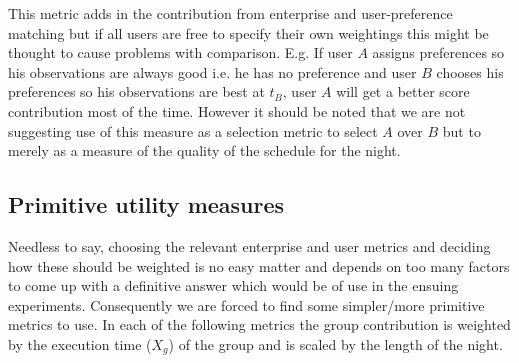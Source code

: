 This metric adds in the contribution from enterprise and user-preference matching but if all users are free to specify their own weightings this might be thought to cause problems with comparison. E.g. If user $A$ assigns preferences so his observations are always good i.e. he has no preference and user $B$ chooses his preferences so his observations are best at $t_B$, user $A$ will get a better score contribution most of the time. However it should be noted that we are not suggesting use of this measure as a selection metric to select $A$ over $B$ but to merely as a measure of the quality of the schedule for the night.




\subsection{Primitive utility measures}
\label{sect:prim_metrics}
Needless to say, choosing the relevant enterprise and user metrics and deciding how these should be weighted is no easy matter and depends on too many factors to come up with a definitive answer which would be of use in the ensuing experiments. Consequently we are forced to find some simpler/more primitive metrics to use. In each of the following metrics the group contribution is weighted by the execution time ($X_g$) of the group and is scaled by the length of the night.

